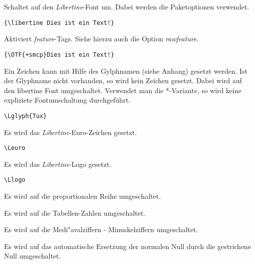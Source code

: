 \documentclass{fontdoku}
\begin{document}
\begin{description}[\setleftmargin{1em}\breaklabel]
\item [\textbackslash libertine]%
      Schaltet auf den \emph{Libertine}-Font um. Dabei werden die Paketoptionen verwendet.
\begin{lstlisting}
{\libertine Dies ist ein Text!}
\end{lstlisting}

\item [\textbackslash OTF]%
      Aktiviert \emph{feature}-Tags. Siehe hierzu auch die Option \emph{rawfeature}.
\begin{lstlisting}
{\OTF{+smcp}Dies ist ein Text!}
\end{lstlisting}

\item [\textbackslash Lglyph]%
      Ein Zeichen kann mit Hilfe des Gylphnamen (siehe Anhang) gesetzt werden. Ist der Glyphname
      nicht vorhanden, so wird kein Zeichen gesetzt. Dabei wird auf den libertine Font umgeschaltet. Verwendet man die *-Variante, so wird keine expliziete Fontumschaltung durchgeführt.
\begin{lstlisting}
\Lglyph{Tux}
\end{lstlisting}

\item [\textbackslash Leuro]%
      Es wird das \emph{Libertine}-Euro-Zeichen gesetzt.
\begin{lstlisting}
\Leuro
\end{lstlisting}

\item [\textbackslash Llogo]%
      Es wird das \emph{Libertine}-Logo gesetzt.
\begin{lstlisting}
\Llogo
\end{lstlisting}

\item [\textbackslash numprp]%
      Es wird auf die proportionalen Reihe umgeschaltet.

\item [\textbackslash numtab]%
      Es wird auf die Tabellen-Zahlen umgeschaltet.

\item [\textbackslash numold]%
      Es wird auf die Medi"avalziffern - Minuskelziffern umgeschaltet.

\item [\textbackslash numzero]%
      Es wird auf das automatische Ersetzung der normalen Null durch die gestrichene Null umgeschaltet.


\end{description}
\end{document}
